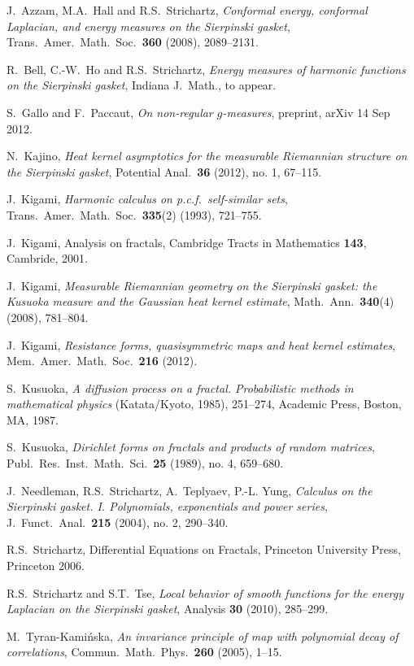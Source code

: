 \documentclass[11pt]{scrartcl}
\theoremstyle{plain} %
\theoremstyle{definition}
\begin{document}
\begin{thebibliography}{999}
 J.\ Azzam, M.A.\ Hall and R.S.\ Strichartz, {\em Conformal energy, conformal 
Laplacian, and energy measures on the Sierpinski gasket}, 
Trans.\ Amer.\ Math.\ Soc.\ {\bf 360} (2008), 2089--2131.

 R.\ Bell, C.-W.\ Ho and R.S.\ Strichartz, {\em Energy 
measures of harmonic functions on the Sierpinski gasket}, Indiana J.\ Math., to appear.

 S.\ Gallo and F.\ Paccaut, {\em On non-regular 
$g$-measures}, preprint, arXiv 14 Sep 2012.

  N.\ Kajino, {\em Heat kernel asymptotics for the measurable Riemannian structure on the Sierpinski gasket}, Potential Anal.\ {\bf 36} (2012), no. 1, 67--115.

 J.\ Kigami, {\em Harmonic calculus on p.c.f.\ self-similar sets}, Trans.\ Amer.\ Math.\ Soc.\ {\bf 335}(2) (1993), 721--755.

 J.\ Kigami, Analysis on fractals, Cambridge Tracts in Mathematics {\bf 143}, Cambride, 2001.

 J.\ Kigami, {\em Measurable Riemannian geometry on the Sierpinski gasket: 
the Kusuoka measure and the Gaussian heat kernel estimate}, Math.\ Ann.\  {\bf 340}(4) (2008), 781--804.

 J.\ Kigami, {\em Resistance forms, quasisymmetric maps and heat kernel estimates}, Mem.\ Amer.\ Math.\ Soc.\ {\bf 216} (2012).

 S.\ Kusuoka, {\em A diffusion process on a fractal. Probabilistic methods in mathematical physics} (Katata/Kyoto, 1985), 251--274, Academic Press, Boston, MA, 1987.

 S.\ Kusuoka, {\em Dirichlet forms on fractals and products of random matrices}, Publ.\ Res.\ Inst.\ Math.\ Sci.\ {\bf 25} (1989), no. 4, 659--680.

 J.\ Needleman, R.S.\ Strichartz, A.\ Teplyaev, P.-L. Yung, {\em Calculus on the Sierpinski gasket. I. Polynomials, exponentials and power series}, J.\ Funct.\ Anal.\ {\bf 215} (2004), no. 2, 290--340.

 R.S.\ Strichartz, Differential Equations on Fractals, 
Princeton University Press, Princeton 2006.

 R.S.\ Strichartz and S.T.\ Tse, {\em Local behavior of 
smooth functions for the energy Laplacian on the Sierpinski gasket}, 
Analysis {\bf 30} (2010), 285--299.

 M.\ Tyran-Kami\'nska, {\em An invariance principle of map with polynomial decay of correlations}, 
Commun.\ Math.\ Phys.\ {\bf 260} (2005), 1--15.

\end{thebibliography}
\end{document}
